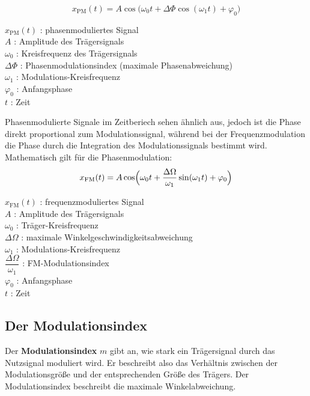 \documentclass[12pt]{scrartcl}
\begin{document}
\begin{equation}
    x_{\mathrm{PM}}(t) = A \cos\bigl(\omega_0 t + \Delta\Phi \cos(\omega_1 t) + \varphi_0\bigr)
\end{equation}
\begin{center}
    $x_{\mathrm{PM}}(t)$ : phasenmoduliertes Signal\\
    $A$ : Amplitude des Trägersignals\\
    $\omega_0$ : Kreisfrequenz des Trägersignals\\
    $\Delta\Phi$ : Phasenmodulationsindex (maximale Phasenabweichung)\\
    $\omega_1$ : Modulations-Kreisfrequenz\\
    $\varphi_0$ : Anfangsphase\\
    $t$ : Zeit
\end{center}
Phasenmodulierte Signale im Zeitberiech sehen ähnlich aus, jedoch ist die Phase direkt proportional zum Modulationssignal, während bei der Frequenzmodulation die Phase durch die Integration des Modulationssignals bestimmt wird.
Mathematisch gilt für die Phasenmodulation:
\begin{equation}
    x_{\mathrm{FM}}(t) = A \cos\Bigl(\omega_0 t + \frac{\Delta\Omega}{\omega_1}\sin(\omega_1 t) + \varphi_0\Bigr)
\end{equation}
\begin{center}
    $x_{\mathrm{FM}}(t)$ : frequenzmoduliertes Signal\\
    $A$ : Amplitude des Trägersignals\\
    $\omega_0$ : Träger-Kreisfrequenz\\
    $\Delta\Omega$ : maximale Winkelgeschwindigkeitsabweichung\\
    $\omega_1$ : Modulations-Kreisfrequenz\\
    $\dfrac{\Delta\Omega}{\omega_1}$ : FM-Modulationsindex\\
    $\varphi_0$ : Anfangsphase\\
    $t$ : Zeit
\end{center}

\subsection{Der Modulationsindex}

Der \textbf{Modulationsindex} $m$ gibt an, wie stark ein Trägersignal durch das Nutzsignal moduliert wird. 
Er beschreibt also das Verhältnis zwischen der Modulationsgröße und der entsprechenden Größe des Trägers.
Der Modulationsindex beschreibt die maximale Winkelabweichung.
\end{document}
